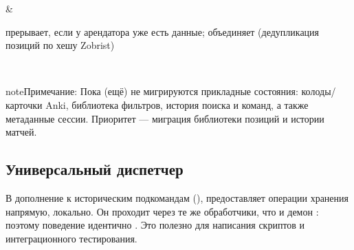 \documentclass[letterpaper,10pt,russian]{sphinxmanual}
\begin{document}
\begin{savenotes}
\begin{tabular}[t]{}
\begin{varwidth}[t]{}
\sphinxAtStartPar
{}
\sphinxbeforeendvarwidth
\end{varwidth}%
&\begin{varwidth}[t]{}
\sphinxAtStartPar
{} прерывает, если у арендатора уже есть данные;  объединяет (дедупликация позиций по хешу Zobrist)
\sphinxbeforeendvarwidth
\end{varwidth}%
\\
\sphinxbottomrule
\end{tabular}
\sphinxtableafterendhook\par
\sphinxattableend\end{savenotes}

\begin{sphinxadmonition}{note}{Примечание:}
\sphinxAtStartPar
Пока (ещё) не мигрируются прикладные состояния: колоды/карточки Anki, библиотека фильтров, история поиска и команд, а также метаданные сессии. Приоритет — миграция библиотеки позиций и истории матчей.
\end{sphinxadmonition}


\subsection{Универсальный диспетчер }
\label{\detokenize{mode_headless:le-dispatcher-generique-call}}\label{\detokenize{mode_headless:headless-call}}
\sphinxAtStartPar
В дополнение к историческим подкомандам ({\hyperref[\detokenize{cli:cli}]{}}),  предоставляет  операции хранения напрямую, локально. Он проходит через те же обработчики, что и демон : поэтому поведение идентично . Это полезно для написания скриптов и интеграционного тестирования.
\end{document}
